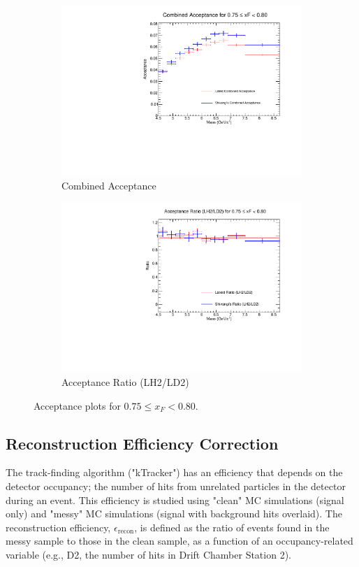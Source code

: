 \documentclass[11pt]{article}
\begin{document}
\begin{figure}[p]
\begin{subfigure}[b]{0.48\textwidth}
       \includegraphics[width=\linewidth]{./acceptancePlots/Combined_acceptance_xF_bin_15.pdf}
       \caption{Combined Acceptance}
    \end{subfigure}\hfill
    \begin{subfigure}[b]{0.48\textwidth}
       \includegraphics[width=\linewidth]{./acceptancePlots/Acceptance_ratio_xF_bin_15.pdf}
       \caption{Acceptance Ratio (LH2/LD2)}
    \end{subfigure}
    \caption{Acceptance plots for $0.75 \le x_F < 0.80$.}
\end{figure}

\FloatBarrier

\subsection{Reconstruction Efficiency Correction}
\label{sec:ktracker_eff}
The track-finding algorithm ("kTracker") has an efficiency that depends on the detector occupancy; the number of hits from unrelated particles in the detector during an event. This efficiency is studied using "clean" MC simulations (signal only) and "messy" MC simulations (signal with background hits overlaid). The reconstruction efficiency, $\epsilon_{\text{recon}}$, is defined as the ratio of events found in the messy sample to those in the clean sample, as a function of an occupancy-related variable (e.g., D2, the number of hits in Drift Chamber Station 2).
\end{document}
